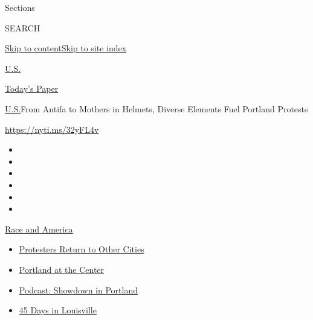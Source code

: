 Sections

SEARCH

\protect\hyperlink{site-content}{Skip to
content}\protect\hyperlink{site-index}{Skip to site index}

\href{https://www.nytimes3xbfgragh.onion/section/us}{U.S.}

\href{https://myaccount.nytimes3xbfgragh.onion/auth/login?response_type=cookie\&client_id=vi}{}

\href{https://www.nytimes3xbfgragh.onion/section/todayspaper}{Today's
Paper}

\href{/section/us}{U.S.}\textbar{}From Antifa to Mothers in Helmets,
Diverse Elements Fuel Portland Protests

\url{https://nyti.ms/32yFL4v}

\begin{itemize}
\item
\item
\item
\item
\item
\item
\end{itemize}

\href{https://www.nytimes3xbfgragh.onion/news-event/george-floyd-protests-minneapolis-new-york-los-angeles?action=click\&pgtype=Article\&state=default\&region=TOP_BANNER\&context=storylines_menu}{Race
and America}

\begin{itemize}
\tightlist
\item
  \href{https://www.nytimes3xbfgragh.onion/2020/07/26/us/protests-portland-seattle-trump.html?action=click\&pgtype=Article\&state=default\&region=TOP_BANNER\&context=storylines_menu}{Protesters
  Return to Other Cities}
\item
  \href{https://www.nytimes3xbfgragh.onion/2020/07/24/us/portland-oregon-protests-white-race.html?action=click\&pgtype=Article\&state=default\&region=TOP_BANNER\&context=storylines_menu}{Portland
  at the Center}
\item
  \href{https://www.nytimes3xbfgragh.onion/2020/07/23/podcasts/the-daily/portland-protests.html?action=click\&pgtype=Article\&state=default\&region=TOP_BANNER\&context=storylines_menu}{Podcast:
  Showdown in Portland}
\item
  \href{https://www.nytimes3xbfgragh.onion/interactive/2020/07/16/us/black-lives-matter-protests-louisville-breonna-taylor.html?action=click\&pgtype=Article\&state=default\&region=TOP_BANNER\&context=storylines_menu}{45
  Days in Louisville}
\end{itemize}


